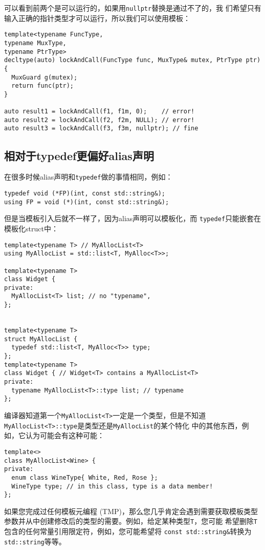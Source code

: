 可以看到前两个是可以运行的，如果用\texttt{nullptr}替换是通过不了的，我
们希望只有输入正确的指针类型才可以运行，所以我们可以使用模板：
\begin{verbatim}
template<typename FuncType,
typename MuxType,
typename PtrType>
decltype(auto) lockAndCall(FuncType func, MuxType& mutex, PtrType ptr){
  MuxGuard g(mutex);
  return func(ptr);
}

auto result1 = lockAndCall(f1, f1m, 0);    // error!
auto result2 = lockAndCall(f2, f2m, NULL); // error!
auto result3 = lockAndCall(f3, f3m, nullptr); // fine
\end{verbatim}

\subsection{相对于typedef更偏好alias声明}
\label{sec:Item2-9}

在很多时候alias声明和\texttt{typedef}做的事情相同，例如：
\begin{verbatim}
typedef void (*FP)(int, const std::string&);
using FP = void (*)(int, const std::string&);
\end{verbatim}

但是当模板引入后就不一样了，因为alias声明可以模板化，而
\texttt{typedef}只能嵌套在模板化struct中：
\begin{verbatim}
template<typename T> // MyAllocList<T>
using MyAllocList = std::list<T, MyAlloc<T>>;

template<typename T>
class Widget {
private:
  MyAllocList<T> list; // no "typename",
};


template<typename T> 
struct MyAllocList { 
  typedef std::list<T, MyAlloc<T>> type;
};
template<typename T>
class Widget { // Widget<T> contains a MyAllocList<T>
private: 
  typename MyAllocList<T>::type list; // typename
};
\end{verbatim}

编译器知道第一个\texttt{MyAllocList<T>}一定是一个类型，但是不知道
\texttt{MyAllocList<T>::type}是类型还是\texttt{MyAllocList}的某个特化
中的其他东西，例如，它认为可能会有这种可能：
\begin{verbatim}
template<> 
class MyAllocList<Wine> {
private:
  enum class WineType{ White, Red, Rose }; 
  WineType type; // in this class, type is a data member!
};
\end{verbatim}

如果您完成过任何模板元编程 (TMP)，那么您几乎肯定会遇到需要获取模板类型
参数并从中创建修改后的类型的需要。例如，给定某种类型\texttt{T}，您可能
希望删除\texttt{T}包含的任何常量引用限定符，例如，您可能希望将
\texttt{const std::string\&}转换为\texttt{std::string}等等。

